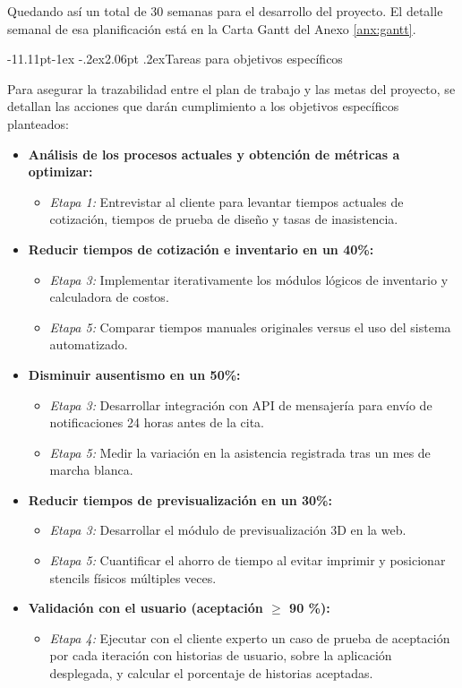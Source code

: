\documentclass[12pt,letterpaper,oneside]{report}
\makeatletter
\renewcommand\subsection{\@startsection{subsection}{2}{\z@}%
  {-11.11pt\@plus -1ex \@minus -.2ex}{2.06pt \@plus .2ex}{\normalfont\normalsize\bfseries}}
\makeatother
\begin{document}
Quedando así un total de 30 semanas para el desarrollo del proyecto. El detalle semanal de esa planificación está en la Carta Gantt del Anexo \ref{anx:gantt}.

\subsection{Tareas para objetivos específicos}

Para asegurar la trazabilidad entre el plan de trabajo y las metas del proyecto, se detallan las acciones que darán cumplimiento a los objetivos específicos planteados:

\begin{itemize}
  \item \textbf{Análisis de los procesos actuales y obtención de métricas a optimizar:}
  \begin{itemize}
    \item \textit{Etapa 1:} Entrevistar al cliente para levantar tiempos actuales de cotización, tiempos de prueba de diseño y tasas de inasistencia.
  \end{itemize}
  \item \textbf{Reducir tiempos de cotización e inventario en un 40\%:}
  \begin{itemize}
    \item \textit{Etapa 3:} Implementar iterativamente los módulos lógicos de inventario y calculadora de costos.
    \item \textit{Etapa 5:} Comparar tiempos manuales originales versus el uso del sistema automatizado.
  \end{itemize}
  \item \textbf{Disminuir ausentismo en un 50\%:}
  \begin{itemize}
    \item \textit{Etapa 3:} Desarrollar integración con API de mensajería para envío de notificaciones 24 horas antes de la cita.
    \item \textit{Etapa 5:} Medir la variación en la asistencia registrada tras un mes de marcha blanca.
  \end{itemize}
  \item \textbf{Reducir tiempos de previsualización en un 30\%:}
  \begin{itemize}
    \item \textit{Etapa 3:} Desarrollar el módulo de previsualización 3D en la web.
    \item \textit{Etapa 5:} Cuantificar el ahorro de tiempo al evitar imprimir y posicionar stencils físicos múltiples veces.
  \end{itemize}
  \item \textbf{Validación con el usuario (aceptación $\geq$ 90 \%):}
  \begin{itemize}
    \item \textit{Etapa 4:} Ejecutar con el cliente experto un caso de prueba de aceptación por cada iteración con historias de usuario, sobre la aplicación desplegada, y calcular el porcentaje de historias aceptadas.
  \end{itemize}
\end{itemize}
\end{document}
